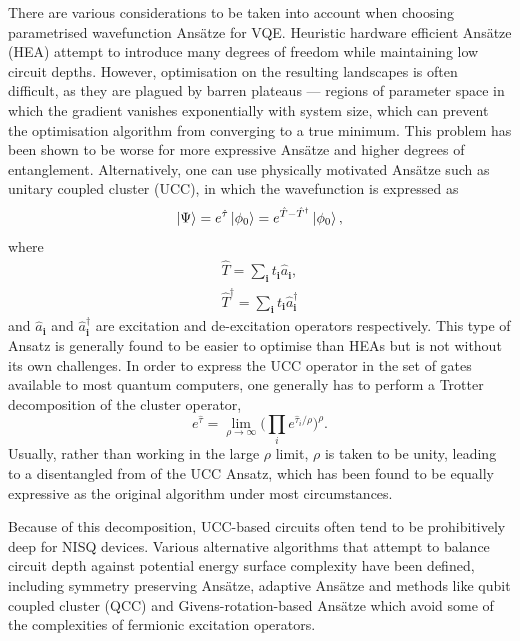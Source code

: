 \documentclass[%
 reprint,
 amsmath,amssymb,
 aps,
]{revtex4-2}
\begin{document}
There are various considerations to be taken into account when choosing parametrised wavefunction Ans\"atze for VQE. Heuristic hardware efficient Ans\"atze (HEA)\cite{Kandala2017} attempt to introduce many degrees of freedom while maintaining low circuit depths. However, optimisation on the resulting landscapes is often difficult, as they are plagued by barren plateaus\cite{McClean2018} --- regions of parameter space in which the gradient vanishes exponentially with system size, which can prevent the optimisation algorithm from converging to a true minimum. This problem has been shown to be worse for more expressive Ans\"atze \cite{Holmes2022} and higher degrees of entanglement.\cite{Marrero2021} Alternatively, one can use physically motivated Ans\"atze such as unitary coupled cluster (UCC),\cite{Kutzelnigg1982,Kutzelnigg1983,Kutzelnigg1984,Bartlett1989} in which the wavefunction is expressed as
\begin{equation}
\ket{\Psi} = e^{\hat \tau}\ket{\phi_0} = e^{\hat T - \hat T^\dagger}\ket{\phi_0},
\end{equation}
where
\begin{align}
\hat T = \sum_\mathbf{i} t_\mathbf{i} \hat a_\mathbf{i},\\
\hat T^\dagger = \sum_\mathbf{i} t_\mathbf{i} \hat a_\mathbf{i}^\dagger
\end{align}
and $\hat a_\mathbf{i}$ and $\hat a_\mathbf{i}^\dagger$ are excitation and de-excitation operators respectively. This type of Ansatz is generally found to be easier to optimise than HEAs but is not without its own challenges. In order to express the UCC operator in the set of gates available to most quantum computers, one generally has to perform a Trotter decomposition\cite{Trotter1959, Suzuki1976} of the cluster operator,
\begin{equation}
 e^{\hat \tau} = \lim_{\rho \rightarrow \infty}\Big(\prod_i e^{\hat\tau_i/\rho}\Big)^\rho.
\end{equation}
Usually, rather than working in the large $\rho$ limit, $\rho$ is taken to be unity, leading to a disentangled from of the UCC Ansatz, which has been found to be equally expressive as the original algorithm under most circumstances.\cite{Evangelista2019}

Because of this decomposition, UCC-based circuits often tend to be prohibitively deep for NISQ devices. Various alternative algorithms that attempt to balance circuit depth against potential energy surface complexity have been defined, including symmetry preserving Ans\"atze,\cite{Gard2020} adaptive Ans\"atze\cite{Grimsley2019b} and methods like qubit coupled cluster (QCC)\cite{Ryabinkin2018,Ryabinkin2020} and Givens-rotation-based Ans\"atze\cite{Arrazola2022} which avoid some of the complexities of fermionic excitation operators.
\end{document}
